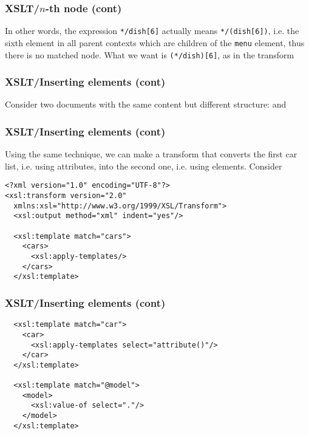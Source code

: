 %
\begin{frame}[containsverbatim]
\frametitle{XSLT/\(n\)-th node (cont)}
 
In other words, the expression \verb|*/dish[6]| actually means
\verb|*/(dish[6])|, i.e. the sixth element in all parent
contexts which are children of the \texttt{menu} element, thus there
is no matched node. What we want is
\verb|(*/dish)[6]|, as in the transform

\end{frame}

%
\begin{frame}
\frametitle{XSLT/Inserting elements (cont)}
\label{cars}

Consider two documents with the same content but different structure:
and

\end{frame}

%
\begin{frame}[containsverbatim]
\frametitle{XSLT/Inserting elements (cont)}
\label{05list07.xsl}

Using the same technique, we can make a transform that converts the
first car list, i.e. using attributes, into the second one, i.e. using
elements. Consider
{\small
\begin{verbatim}
<?xml version="1.0" encoding="UTF-8"?>
<xsl:transform version="2.0"
  xmlns:xsl="http://www.w3.org/1999/XSL/Transform">
  <xsl:output method="xml" indent="yes"/>

  <xsl:template match="cars">
    <cars>
      <xsl:apply-templates/>
    </cars>
  </xsl:template>
\end{verbatim}
}

\end{frame}

%
\begin{frame}[containsverbatim]
\frametitle{XSLT/Inserting elements (cont)}

{\small
\begin{verbatim}
  <xsl:template match="car">
    <car>
      <xsl:apply-templates select="attribute()"/>
    </car>
  </xsl:template>

  <xsl:template match="@model">
    <model>
      <xsl:value-of select="."/>
    </model>
  </xsl:template>
\end{verbatim}
}

\end{frame}

